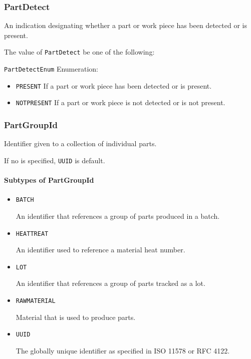 \subsubsection{PartDetect}
\label{sec:PartDetect}



An indication designating whether a part or work piece has been detected or is present.



The value of \texttt{PartDetect} \MUST be one of the following: 


\texttt{PartDetectEnum} Enumeration:

\begin{itemize}
\item \texttt{PRESENT} \newline If a part or work piece has been detected or is present. 
\item \texttt{NOT\textunderscore PRESENT} \newline If a part or work piece is not detected or is not present. 
\end{itemize}



\subsubsection{PartGroupId}
\label{sec:PartGroupId}



Identifier given to a collection of individual parts. 

If no  is specified, \texttt{UUID} is default.


\paragraph{Subtypes of PartGroupId}\mbox{}
\label{sec:Subtypes of PartGroupId}

\begin{itemize}

\item \texttt{BATCH}


An identifier that references a group of parts produced in a batch.

\item \texttt{HEAT\textunderscore TREAT}


An identifier used to reference a material heat number.

\item \texttt{LOT}


An identifier that references a group of parts tracked as a lot.


\item \texttt{RAW\textunderscore MATERIAL}


Material that is used to produce parts.

\item \texttt{UUID}


The globally unique identifier as specified in ISO 11578 or RFC 4122.


\end{itemize}








